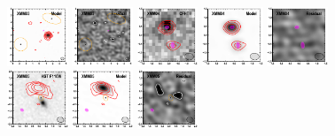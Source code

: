 \documentclass[iop]{emulateapj}
\begin{document}
\begin{figure}[!tbp]
\begin{centering}
\includegraphics[width=0.162\textwidth]{../Figures/modelfit/XMM03_model_bestfit.pdf}
\includegraphics[width=0.162\textwidth]{../Figures/modelfit/XMM03_residual_bestfit.pdf}
\includegraphics[width=0.162\textwidth]{../Figures/modelfit/XMM04_optical_bestfit.pdf}
\includegraphics[width=0.162\textwidth]{../Figures/modelfit/XMM04_model_bestfit.pdf}
\includegraphics[width=0.162\textwidth]{../Figures/modelfit/XMM04_residual_bestfit.pdf}
\includegraphics[width=0.162\textwidth]{../Figures/modelfit/XMM05_optical_bestfit.pdf}
\includegraphics[width=0.162\textwidth]{../Figures/modelfit/XMM05_model_bestfit.pdf}
\includegraphics[width=0.162\textwidth]{../Figures/modelfit/XMM05_residual_bestfit.pdf}

\end{centering}
\end{figure}
\end{document}
